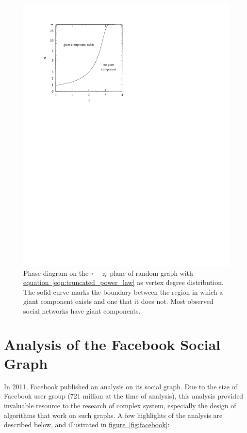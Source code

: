 \documentclass[11pt,a4paper]{article}
\begin{document}
\begin{figure}[htbp]
	\centering
	\includegraphics[scale=1]{giant_component.pdf}
	\caption{Phase diagram on the $\tau-z_c$ plane of random graph with \hyperref[eqn:truncated_power_law]{equation~\ref{eqn:truncated_power_law}} as vertex degree distribution. The solid curve marks the boundary between the region in which a giant component exists and one that it does not. Most observed social networks have giant components.}
	\label{fig:giant_component}
\end{figure}

\section{Analysis of the Facebook Social Graph}

In 2011, Facebook published an analysis \cite{ugander2011anatomy} on its social graph. Due to the size of Facebook user group (721 million at the time of analysis), this analysis provided invaluable resource to the research of complex system, especially the design of algorithms that work on such graphs. A few highlights of the analysis are described below, and illustrated in \hyperref[fig:facebook]{figure~\ref{fig:facebook}}:
\end{document}

